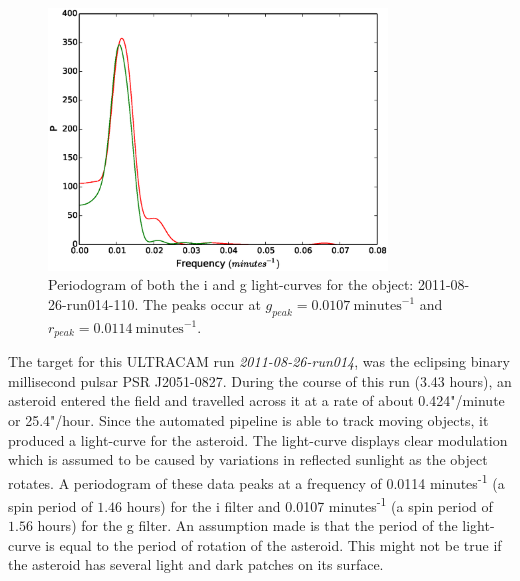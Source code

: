 \begin{figure}
  \center
  \includegraphics[width=90mm]{images/2011-08-26-run014-110-pgram-bin4.eps} 
  \caption{Periodogram of both the i and g light-curves for the object: 2011-08-26-run014-110. The peaks occur at $g_{peak} = 0.0107 \ \mbox{minutes}^{-1}$ and  $r_{peak} = 0.0114\ \mbox{minutes}^{-1}$.}
  \label{fig:asteroidpgram}
\end{figure}

  
The target for this ULTRACAM run \emph{2011-08-26-run014}, was the eclipsing binary millisecond pulsar PSR J2051-0827. During the course of this run (3.43 hours), an asteroid entered the field and travelled across it at a rate of about 0.424"/minute or 25.4"/hour. Since the automated pipeline is able to track moving objects, it produced a light-curve for the asteroid. The light-curve displays clear modulation which is assumed to be caused by variations in reflected sunlight as the object rotates. A periodogram of these data peaks at a frequency of 0.0114 minutes\textsuperscript{-1} (a spin period of $1.46$ hours) for the i filter and 0.0107 minutes\textsuperscript{-1} (a spin period of $1.56$ hours) for the g filter. An assumption made is that the period of the light-curve is equal to the period of rotation of  the asteroid. This might not be true if the asteroid has several light and dark patches on its surface. 

